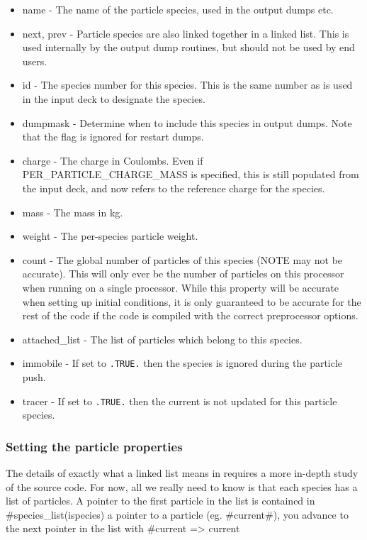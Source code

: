 \begin{itemize}
\item name - The name of the particle species, used in the output dumps etc.
\item next, prev - Particle species are also linked together in a linked
  list. This is used internally by the output dump routines, but should not be
  used by end users.
\item id - The species number for this species. This is the same number as is
  used in the input deck to designate the species.
\item dumpmask - Determine when to include this species in output
  dumps. Note that the flag is ignored for restart dumps.
\item charge - The charge in Coulombs. Even if PER\_PARTICLE\_CHARGE\_MASS is
  specified, this is still populated from the input deck, and now refers to
  the reference charge for the species.
\item mass - The mass in kg.
\item weight - The per-species particle weight.
\item count - The global number of particles of this species (NOTE may not
  be accurate). This will only ever be the number of particles on this
  processor when running on a single processor. While this property will be
  accurate when setting up initial conditions, it is only guaranteed to be
  accurate for the rest of the code if the code is compiled with the correct
  preprocessor options.
\item attached\_list - The list of particles which belong to this species.
\item immobile - If set to \verb|.TRUE.| then the species is ignored during
  the particle push.
\item tracer - If set to \verb|.TRUE.| then the current is not updated for this
  particle species.
\end{itemize}


\subsubsection{Setting the particle properties}
The details of exactly what a linked list means in {\EPOCH} requires
a more in-depth study of the source code.
For now, all we really need to know is that each
species has a list of particles. A pointer to the first particle in the list
is contained in #species_list(ispecies)%
a pointer to a particle (eg. #current#), you advance to the next pointer in
the list with #current => current%

